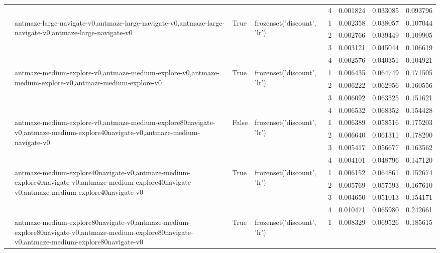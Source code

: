\begin{tabular}{lllllrrr}
 &  &  &  & 4 & 0.001824 & 0.033085 & 0.093796 \\
\cline{2-8} \cline{3-8} \cline{4-8}
 & \multirow[t]{4}{*}{antmaze-large-navigate-v0,antmaze-large-navigate-v0,antmaze-large-navigate-v0,antmaze-large-navigate-v0} & \multirow[t]{4}{*}{True} & \multirow[t]{4}{*}{frozenset({'discount', 'lr'})} & 1 & 0.002358 & 0.038057 & 0.107044 \\
 &  &  &  & 2 & 0.002766 & 0.039449 & 0.109905 \\
 &  &  &  & 3 & 0.003121 & 0.045044 & 0.106619 \\
 &  &  &  & 4 & 0.002576 & 0.040351 & 0.104921 \\
\cline{2-8} \cline{3-8} \cline{4-8}
 & \multirow[t]{4}{*}{antmaze-medium-explore-v0,antmaze-medium-explore-v0,antmaze-medium-explore-v0,antmaze-medium-explore-v0} & \multirow[t]{4}{*}{True} & \multirow[t]{4}{*}{frozenset({'discount', 'lr'})} & 1 & 0.006435 & 0.064749 & 0.171505 \\
 &  &  &  & 2 & 0.006222 & 0.062956 & 0.160556 \\
 &  &  &  & 3 & 0.006092 & 0.063525 & 0.151621 \\
 &  &  &  & 4 & 0.006532 & 0.068352 & 0.154428 \\
\cline{2-8} \cline{3-8} \cline{4-8}
 & \multirow[t]{4}{*}{antmaze-medium-explore-v0,antmaze-medium-explore80navigate-v0,antmaze-medium-explore40navigate-v0,antmaze-medium-navigate-v0} & \multirow[t]{4}{*}{False} & \multirow[t]{4}{*}{frozenset({'discount', 'lr'})} & 1 & 0.006389 & 0.058516 & 0.175203 \\
 &  &  &  & 2 & 0.006640 & 0.061311 & 0.178290 \\
 &  &  &  & 3 & 0.005417 & 0.056677 & 0.163562 \\
 &  &  &  & 4 & 0.004101 & 0.048796 & 0.147120 \\
\cline{2-8} \cline{3-8} \cline{4-8}
 & \multirow[t]{4}{*}{antmaze-medium-explore40navigate-v0,antmaze-medium-explore40navigate-v0,antmaze-medium-explore40navigate-v0,antmaze-medium-explore40navigate-v0} & \multirow[t]{4}{*}{True} & \multirow[t]{4}{*}{frozenset({'discount', 'lr'})} & 1 & 0.006152 & 0.064861 & 0.152674 \\
 &  &  &  & 2 & 0.005769 & 0.057593 & 0.167610 \\
 &  &  &  & 3 & 0.004650 & 0.051013 & 0.154171 \\
 &  &  &  & 4 & 0.010471 & 0.065980 & 0.242661 \\
\cline{2-8} \cline{3-8} \cline{4-8}
 & \multirow[t]{4}{*}{antmaze-medium-explore80navigate-v0,antmaze-medium-explore80navigate-v0,antmaze-medium-explore80navigate-v0,antmaze-medium-explore80navigate-v0} & \multirow[t]{4}{*}{True} & \multirow[t]{4}{*}{frozenset({'discount', 'lr'})} & 1 & 0.008329 & 0.069526 & 0.185615 \\

\end{tabular}

